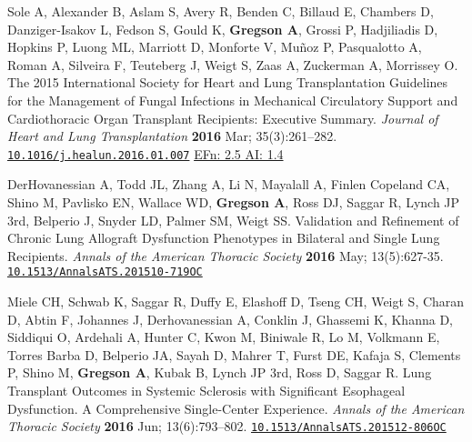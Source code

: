 \documentclass[letterpaper,11pt,sans,dvipsnames,final]{/usr/local/share/texmf-dist/tex/latex/moderncv/moderncv}%
\begin{document}
\begin{thebibliography}{1}
  \bibitem[30]{} Sole A, Alexander B, Aslam S, Avery R, Benden C, Billaud E, Chambers D, Danziger-Isakov L, Fedson S, Gould K, \textbf{Gregson A}, Grossi P, Hadjiliadis D, Hopkins P, Luong ML, Marriott D, Monforte V, Mu\~{n}oz P, Pasqualotto A, Roman A, Silveira F, Teuteberg J, Weigt S, Zaas A, Zuckerman A, Morrissey O. The 2015 International Society for Heart and Lung Transplantation Guidelines for the Management of Fungal Infections in Mechanical Circulatory Support and Cardiothoracic Organ Transplant Recipients: Executive Summary.  {\color{BrickRed}\textit{Journal of Heart and Lung Transplantation}} \textbf{2016} Mar; 35(3):261--282. \href{http://www.sciencedirect.com/science/article/pii/S1053249816000541}{\nolinkurl{10.1016/j.healun.2016.01.007}}
    {\color{NavyBlue} \href{http://www.eigenfactor.org/rankings.php?search=JOURNAL+OF+HEART+AND+LUNG+TRANSPLANTATION&search2=&search3=&searchby=journal}{{\smaller EFn: 2.5 AI: 1.4}}
    }

  \bibitem[31]{} DerHovanessian A, Todd JL, Zhang A, Li N, Mayalall A, Finlen Copeland CA, Shino M, Pavlisko EN, Wallace WD, \textbf{Gregson A}, Ross DJ, Saggar R, Lynch JP 3rd, Belperio J, Snyder LD, Palmer SM, Weigt SS. Validation and Refinement of Chronic Lung Allograft Dysfunction Phenotypes in Bilateral and Single Lung Recipients. {\color{BrickRed}\textit{Annals of the American Thoracic Society}} \textbf{2016} May; 13(5):627-35. \href{http://www.atsjournals.org/doi/10.1513/AnnalsATS.201510-719OC#.V3wodPEjW5M}{\nolinkurl{10.1513/AnnalsATS.201510-719OC}} 

\bibitem[32]{} Miele CH, Schwab K, Saggar R, Duffy E, Elashoff D, Tseng CH, Weigt S, Charan D, Abtin F, Johannes J, Derhovanessian A, Conklin J, Ghassemi K, Khanna D, Siddiqui O, Ardehali A, Hunter C, Kwon M, Biniwale R, Lo M, Volkmann E, Torres Barba D, Belperio JA, Sayah D, Mahrer T, Furst DE, Kafaja S, Clements P, Shino M, \textbf{Gregson A}, Kubak B, Lynch JP 3rd, Ross D, Saggar R. Lung Transplant Outcomes in Systemic Sclerosis with Significant Esophageal Dysfunction. A Comprehensive Single-Center Experience. {\color{BrickRed}\textit{Annals of the American Thoracic Society}} \textbf{2016} Jun; 13(6):793--802. \href{http://www.atsjournals.org/doi/10.1513/AnnalsATS.201512-806OC#.V3wkRvEjW5M}{\nolinkurl{10.1513/AnnalsATS.201512-806OC}}


\end{thebibliography}
\end{document}
